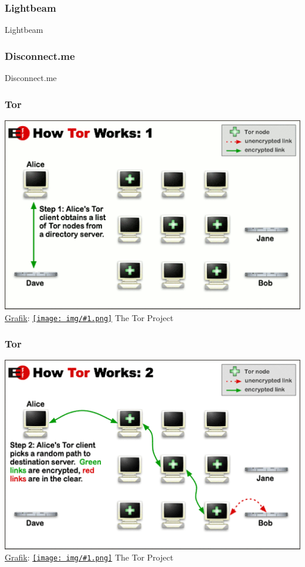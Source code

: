 \documentclass[12pt]{beamer}
\newcommand{\cc}[1]{\texttt{[image: img/\#1.png]}}
\begin{document}
\begin{frame}
    \frametitle{Lightbeam}
    \begin{center} \Large Lightbeam \end{center}
\end{frame}

\begin{frame}
    \frametitle{Disconnect.me}
    \begin{center} \Large Disconnect.me \end{center}
\end{frame}

\begin{frame}
    \frametitle{Tor}
    \includegraphics[height=0.7\textheight]{img/tor1.png}
    \\{\small \href{https://www.torproject.org/images/htw1.png}{Grafik}: \href{https://creativecommons.org/licenses/by/3.0/us/}{\cc{by}} The Tor Project}
\end{frame}

\begin{frame}
    \frametitle{Tor}
    \includegraphics[height=0.7\textheight]{img/tor2.png}
    \\{\small \href{https://www.torproject.org/images/htw2.png}{Grafik}: \href{https://creativecommons.org/licenses/by/3.0/us/}{\cc{by}} The Tor Project}
\end{frame}
\end{document}
